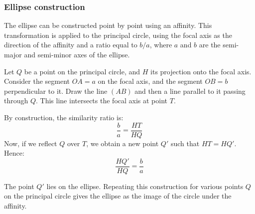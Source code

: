 
\subsubsection{Ellipse construction} %
\label{ssub:ellipse_construction}

The ellipse can be constructed point by point using an affinity. This transformation is applied to the principal circle, using the focal axis as the direction of the affinity and a ratio equal to $b/a$, where $a$ and $b$ are the semi-major and semi-minor axes of the ellipse.

Let $Q$ be a point on the principal circle, and $H$ its projection onto the focal axis. Consider the segment $OA = a$ on the focal axis, and the segment $OB = b$ perpendicular to it. Draw the line $(AB)$ and then a line parallel to it passing through $Q$. This line intersects the focal axis at point $T$.

By construction, the similarity ratio is:
\[
\frac{b}{a} = \frac{HT}{HQ}
\]
Now, if we reflect $Q$ over $T$, we obtain a new point $Q'$ such that $HT = HQ'$. Hence:
\[
\frac{HQ'}{HQ} = \frac{b}{a}
\]

The point $Q'$ lies on the ellipse. Repeating this construction for various points $Q$ on the principal circle gives the ellipse as the image of the circle under the affinity.

